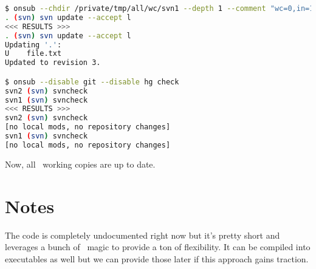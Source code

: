 \begin{snugshade}
\begin{lstlisting}[language=bash]	
$ onsub --chdir /private/tmp/all/wc/svn1 --depth 1 --comment "wc=0,in=1" {download-get}
. (svn) svn update --accept l
<<< RESULTS >>>
. (svn) svn update --accept l
Updating '.':
U    file.txt
Updated to revision 3.

$ onsub --disable git --disable hg check
svn2 (svn) svncheck
svn1 (svn) svncheck
<<< RESULTS >>>
svn2 (svn) svncheck
[no local mods, no repository changes]
svn1 (svn) svncheck
[no local mods, no repository changes]
\end{lstlisting}
\end{snugshade}

Now, all \Subversion\ working copies are up to date.

\section{Notes}

The code is completely undocumented right now but it's pretty short and leverages a bunch of \Python\ magic to provide a ton of flexibility. It can be compiled into executables as well but we can provide those later if this approach gains traction.


